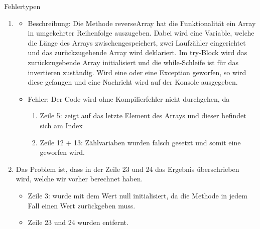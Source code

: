 \documentclass{../preamble}
\begin{document}
\begin{task}[credit = \stars{2}{3}]{Fehlertypen}
\begin{solution}
\begin{enumerate}[label = (\arabic*)]
            \item
                  \begin{itemize}
                      \item Beschreibung:
                            \newline
                            Die Methode reverseArray hat die Funktionalität ein Array in umgekehrter Reihenfolge auszugeben. Dabei wird eine Variable, welche die Länge des Arrays zwischengespeichert, zwei Laufzähler eingerichtet und das zurückzugebende Array wird deklariert. Im \textcolor{keywordcolor}{try}-Block wird das zurückzugebende Array initialisiert und die \textcolor{keywordcolor}{while}-Schleife ist für das invertieren zuständig. Wird eine  oder eine Exception geworfen, so wird diese gefangen und eine Nachricht wird auf der Konsole ausgegeben.
                      \item Fehler:
                            \newline
                            Der Code wird ohne Kompilierfehler nicht durchgehen, da
                            \begin{enumerate}
                                \item Zeile 5:  zeigt auf das letzte Element des Arrays und dieser befindet sich am Index 
                                \item Zeile 12 + 13: Zählvariaben wurden falsch gesetzt und somit eine  geworfen wird.
                            \end{enumerate}
                  \end{itemize}
                  

                  \clearpage

            \item Das Problem ist, dass in der Zeile 23 und 24 das Ergebnis überschrieben wird, welche wir vorher berechnet haben.
                  
                  \begin{itemize}
                      \item Zeile 3:  wurde mit dem Wert \textcolor{keywordcolor}{null} initialisiert, da die Methode in jedem Fall einen Wert zurückgeben muss.
                      \item Zeile 23 und 24 wurden entfernt.
                  \end{itemize}
        \end{enumerate}
    \end{solution}
\end{task}
\end{document}
